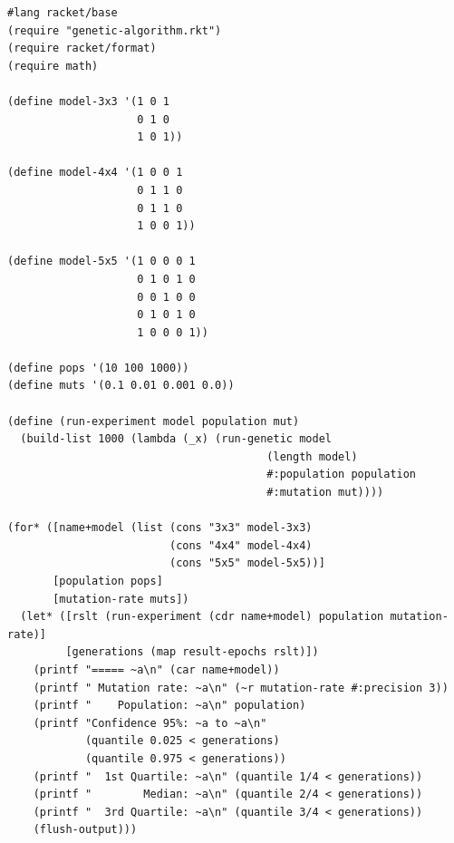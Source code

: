 \documentclass{llncs}
\begin{document}
\begin{lstlisting}
#lang racket/base
(require "genetic-algorithm.rkt")
(require racket/format)
(require math)

(define model-3x3 '(1 0 1
                    0 1 0
                    1 0 1))

(define model-4x4 '(1 0 0 1
                    0 1 1 0
                    0 1 1 0
                    1 0 0 1))

(define model-5x5 '(1 0 0 0 1
                    0 1 0 1 0
                    0 0 1 0 0
                    0 1 0 1 0
                    1 0 0 0 1))

(define pops '(10 100 1000))
(define muts '(0.1 0.01 0.001 0.0))

(define (run-experiment model population mut)
  (build-list 1000 (lambda (_x) (run-genetic model
                                        (length model)
                                        #:population population
                                        #:mutation mut))))

(for* ([name+model (list (cons "3x3" model-3x3)
                         (cons "4x4" model-4x4)
                         (cons "5x5" model-5x5))]
       [population pops]
       [mutation-rate muts])
  (let* ([rslt (run-experiment (cdr name+model) population mutation-rate)]
         [generations (map result-epochs rslt)])
    (printf "===== ~a\n" (car name+model))
    (printf " Mutation rate: ~a\n" (~r mutation-rate #:precision 3))
    (printf "    Population: ~a\n" population)
    (printf "Confidence 95%: ~a to ~a\n"
            (quantile 0.025 < generations)
            (quantile 0.975 < generations))
    (printf "  1st Quartile: ~a\n" (quantile 1/4 < generations))
    (printf "        Median: ~a\n" (quantile 2/4 < generations))
    (printf "  3rd Quartile: ~a\n" (quantile 3/4 < generations))
    (flush-output)))
\end{lstlisting}
\end{document}
